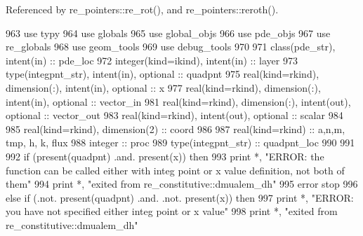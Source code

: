 Referenced by re\+\_\+pointers\+::re\+\_\+rot(), and re\+\_\+pointers\+::reroth().


\begin{DoxyCode}
963       \textcolor{keywordtype}{use }typy
964       \textcolor{keywordtype}{use }globals
965       \textcolor{keywordtype}{use }global_objs
966       \textcolor{keywordtype}{use }pde_objs
967       \textcolor{keywordtype}{use }re_globals
968       \textcolor{keywordtype}{use }geom_tools
969       \textcolor{keywordtype}{use }debug_tools
970 
971       \textcolor{keywordtype}{class}(pde_str), \textcolor{keywordtype}{intent(in)} :: pde\_loc
972       \textcolor{keywordtype}{integer(kind=ikind)}, \textcolor{keywordtype}{intent(in)} :: layer
973       \textcolor{keywordtype}{type}(integpnt_str), \textcolor{keywordtype}{intent(in)}, \textcolor{keywordtype}{optional} :: quadpnt    
975       \textcolor{keywordtype}{real(kind=rkind)}, \textcolor{keywordtype}{dimension(:)}, \textcolor{keywordtype}{intent(in)}, \textcolor{keywordtype}{optional} :: x
977       \textcolor{keywordtype}{real(kind=rkind)}, \textcolor{keywordtype}{dimension(:)}, \textcolor{keywordtype}{intent(in)}, \textcolor{keywordtype}{optional} :: vector\_in
981       \textcolor{keywordtype}{real(kind=rkind)}, \textcolor{keywordtype}{dimension(:)}, \textcolor{keywordtype}{intent(out)}, \textcolor{keywordtype}{optional} :: vector\_out
983       \textcolor{keywordtype}{real(kind=rkind)}, \textcolor{keywordtype}{intent(out)}, \textcolor{keywordtype}{optional} :: scalar
984       
985       \textcolor{keywordtype}{real(kind=rkind)}, \textcolor{keywordtype}{dimension(2)} :: coord
986 
987       \textcolor{keywordtype}{real(kind=rkind)} :: a,n,m, tmp, h, k, flux
988       \textcolor{keywordtype}{integer} :: proc
989       \textcolor{keywordtype}{type}(integpnt_str) :: quadpnt\_loc    
990       
991 
992       \textcolor{keywordflow}{if} (\textcolor{keyword}{present}(quadpnt) .and. \textcolor{keyword}{present}(x)) \textcolor{keywordflow}{then}
993         print *, \textcolor{stringliteral}{"ERROR: the function can be called either with integ point or x value definition, not both
       of them"}
994         print *, \textcolor{stringliteral}{"exited from re\_constitutive::dmualem\_dh"}
995         error stop
996       \textcolor{keywordflow}{else} \textcolor{keywordflow}{if} (.not. \textcolor{keyword}{present}(quadpnt) .and. .not. \textcolor{keyword}{present}(x)) \textcolor{keywordflow}{then}
997         print *, \textcolor{stringliteral}{"ERROR: you have not specified either integ point or x value"}
998         print *, \textcolor{stringliteral}{"exited from re\_constitutive::dmualem\_dh"}

\end{DoxyCode}
